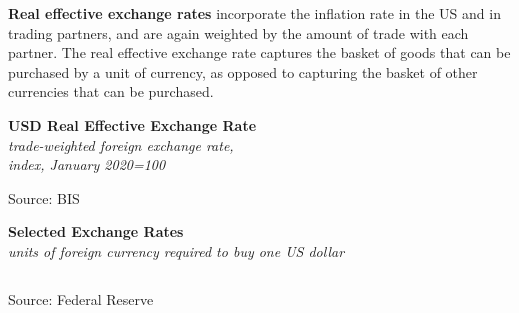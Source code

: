 \documentclass{report}
\makeatletter
\newcommand{\tbllink}[1]{\href{https://raw.githubusercontent.com/bdecon/US-chartbook/master/chartbook/data/#1}{\faTable}}
\newcommand*\short[1]{\expandafter\@gobbletwo\number\numexpr#1\relax}
\newcommand{\shdateaxisticks}{
		date coordinates in=x, axis line style={draw=none},
		xmax={2024-01-31},
		max space between ticks=40,	    
		xtick={{1990-01-01}, {1995-01-01}, {2000-01-01}, 
			{2005-01-01}, {2010-01-01}, {2015-01-01}, {2020-01-01}},
		minor xtick={},
		enlarge y limits={0.06}, enlarge x limits={0.01},
		xticklabel style={align=center, yshift=-2pt}, tick label style={inner sep=0pt},
		}
\newcommand{\bbar}[2]{extra #1 ticks = {{#2}}, extra #1 tick labels = ,
		extra #1 tick style = {grid=major, grid style={thick, black!25}},}
\newcommand{\stdline}[4]{\addplot[very thick, no markers, color=#1] 
		table [x=#2, y=#3, col sep=comma] {#4};	}
\newcommand{\rebars}{
		\fill[color=black!10] (axis cs:{2007-12-01},\pgfkeysvalueof{/pgfplots/ymin}) 
			rectangle (axis cs:{2009-07-01}, \pgfkeysvalueof{/pgfplots/ymax});
		\fill[color=black!10] (axis cs:{2001-03-01},\pgfkeysvalueof{/pgfplots/ymin}) 
			rectangle (axis cs:{2001-11-01}, \pgfkeysvalueof{/pgfplots/ymax});
		\fill[color=black!10] (axis cs:{2020-02-01},\pgfkeysvalueof{/pgfplots/ymin}) 
			rectangle (axis cs:{2020-05-01}, \pgfkeysvalueof{/pgfplots/ymax});}
\makeatother
\begin{document}
{\begin{minipage}{1.0\textwidth}
\textbf{Real effective exchange rates} incorporate the inflation rate in the US and in trading partners, and are again weighted by the amount of trade with each partner. The real effective exchange rate captures the basket of goods that can be purchased by a unit of currency, as opposed to capturing the basket of other currencies that can be purchased. 
\vspace*{-1.5mm}

\begin{minipage}{0.61\textwidth}
\normalsize \textbf{USD Real Effective Exchange Rate}\\
\footnotesize{\textit{trade-weighted foreign exchange rate,}}\\
\footnotesize{\textit{index, January 2020=100}}
\vspace{2.3cm}

\hspace{3mm} 

\footnotesize{Source: BIS} \hfill \tbllink{reer.csv} \ \ 
\end{minipage}\hfill
\begin{minipage}{0.33\textwidth}
\small 
\end{minipage}
\vspace{5mm}

\normalsize \textbf{Selected Exchange Rates}\\
\footnotesize{\textit{units of foreign currency required to buy one US dollar}}\\
\rowcolors{1}{}{black!5} \setlength{\tabcolsep}{1.0pt} \color{black!90}
	{\renewcommand{\arraystretch}{1.52}
		\begin{tabular}{p{12mm} R{14.5mm} R{14.5mm} R{14.5mm} R{14.5mm} R{14.0mm} 
		 				 R{14.0mm} R{14.0mm}}
			  \hline
		\end{tabular}}\vspace{-2mm}
		
\footnotesize{Source: Federal Reserve}
\end{minipage}
\newpage
\hypertarget{lab}{\label{lab}}
}
\end{document}
